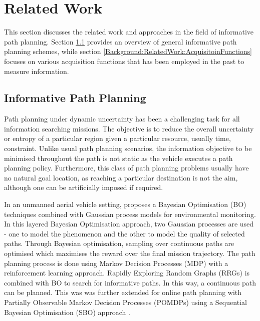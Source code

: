 	\section{Related Work}
	\label{Background:RelatedWork}
		
		This section discusses the related work and approaches in the field of informative path planning. Section \ref{Background:RelatedWork:InformativePathPlanning} provides an overview of general informative path planning schemes, while section \ref{Background:RelatedWork:AcquisitoinFunctions} focuses on various acquisition functions that has been employed in the past to measure information.
				
		\subsection{Informative Path Planning}
		\label{Background:RelatedWork:InformativePathPlanning}
			
			Path planning under dynamic uncertainty has been a challenging task for all information searching missions. The objective is to reduce the overall uncertainty or entropy of a particular region given a particular resource, usually time, constraint. Unlike usual path planning scenarios, the information objective to be minimised throughout the path is not static as the vehicle executes a path planning policy. Furthermore, this class of path planning problems usually have no natural goal location, as reaching a particular destination is not the aim, although one can be artificially imposed if required.
		
			In an unmanned aerial vehicle setting, \cite{Roman:BayesianOptimisation} proposes a Bayesian Optimisation (BO) techniques combined with Gaussian process models for environmental monitoring. In this layered Bayesian Optimisation approach, two Gaussian processes are used - one to model the phenomenon and the other to model the quality of selected paths. Through Bayesian optimisation, sampling over continuous paths are optimised which maximises the reward over the final mission trajectory. The path planning process is done using Markov Decision Processes (MDP) with a reinforcement learning approach. Rapidly Exploring Random Graphs (RRGs) is combined with BO to search for informative paths. In this way, a continuous path can be planned. This was was further extended for online path planning with Partially Observable Markov Decision Processes (POMDPs) using a Sequential Bayesian Optimisation (SBO) approach \citep{Roman:SequentialBayesianOptimisation}.
			
